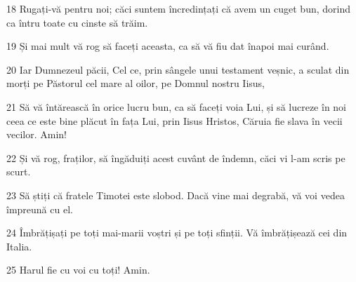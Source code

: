 \par 18 Rugați-vă pentru noi; căci suntem încredințați că avem un cuget bun, dorind ca întru toate cu cinste să trăim.
\par 19 Și mai mult vă rog să faceți aceasta, ca să vă fiu dat înapoi mai curând.
\par 20 Iar Dumnezeul păcii, Cel ce, prin sângele unui testament veșnic, a sculat din morți pe Păstorul cel mare al oilor, pe Domnul nostru Iisus,
\par 21 Să vă întărească în orice lucru bun, ca să faceți voia Lui, și să lucreze în noi ceea ce este bine plăcut în fața Lui, prin Iisus Hristos, Căruia fie slava în vecii vecilor. Amin!
\par 22 Și vă rog, fraților, să îngăduiți acest cuvânt de îndemn, căci vi l-am scris pe scurt.
\par 23 Să știți că fratele Timotei este slobod. Dacă vine mai degrabă, vă voi vedea împreună cu el.
\par 24 Îmbrățișați pe toți mai-marii voștri și pe toți sfinții. Vă îmbrățișează cei din Italia.
\par 25 Harul fie cu voi cu toți! Amin.


